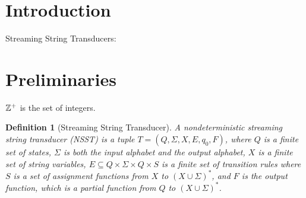 \documentclass[sigplan,review,anonymous]{acmart}\settopmatter{printfolios=true,printccs=false,printacmref=false}
\newtheorem{definition}{Definition}
\begin{document}




\maketitle

\newcommand\NSST{{\sf NSST}}

\newcommand\refexp{{\sf REF}}



\section{Introduction}

Streaming String Transducers: \cite{FR17}

\section{Preliminaries}

$\mathbb{Z}^+$ is the set of integers. 

\begin{definition}[Streaming String Transducer]
  A nondeterministic streaming string transducer (\NSST) is a tuple $T = (Q, \Sigma, X, E, q_0, F)$, where $Q$ is a finite set of states, $\Sigma$ is both the input alphabet and the output alphabet, $X$ is a finite set of string variables, $E \subseteq Q \times \Sigma \times Q \times S$ is a finite set of
  transition rules where $S$ is a set of assignment functions from $X$ to $(X
  \cup \Sigma)^{\ast}$, and $F$ is the output function, which is a partial function from $Q$ to $(X \cup
  \Sigma)^{\ast}$.
  \end{definition}
  
\end{document}
